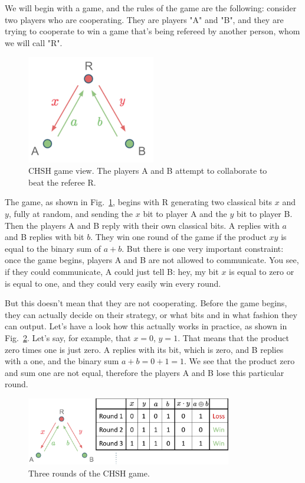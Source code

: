 
We will begin with a game, and the rules of the game are the following: consider two players who are cooperating. They are players "A" and "B", and they are trying to cooperate to win a game that's being refereed by another person, whom we will call "R".

\begin{figure}[H]
    \centering
    \includegraphics[width=0.5\textwidth]{lesson4/CHSH_diagram.pdf}
        \caption[CHSH game view]{CHSH game view. The players A and B attempt to collaborate to beat the referee R.}
    \label{fig:chsh-game}
\end{figure}

The game, as shown in Fig.~\ref{fig:chsh-game}, begins with R generating two classical bits $x$ and $y$, fully at random, and sending the $x$ bit to player A and the $y$ bit to player B. Then the players A and B reply with their own classical bits. A replies with $a$ and B replies with bit $b$. They win one round of the game if the product $xy$ is equal to the binary sum of $a + b$. But there is one very important constraint: once the game begins, players A and B are not allowed to communicate. You see, if they could communicate, A could just tell B: hey, my bit $x$ is equal to zero or is equal to one, and they could very easily win every round.

But this doesn't mean that they are not cooperating. Before the game begins, they can actually decide on their strategy, or what bits and in what fashion they can output. Let's have a look how this actually works in practice, as shown in Fig.~\ref{fig:chsh-game-rounds}. Let's say, for example, that $x =0$, $y = 1$. That means that the product zero times one is just zero. A replies with its bit, which is zero, and B replies with a one, and the binary sum $a + b = 0 + 1 = 1$. We see that the product zero and sum one are not equal, therefore the players A and B lose this particular round.
\begin{figure}[H]
    \centering
    \includegraphics[width=0.8\textwidth]{lesson4/CHSH_rounds.pdf}
        \caption{Three rounds of the CHSH game.}
    \label{fig:chsh-game-rounds}
\end{figure}


